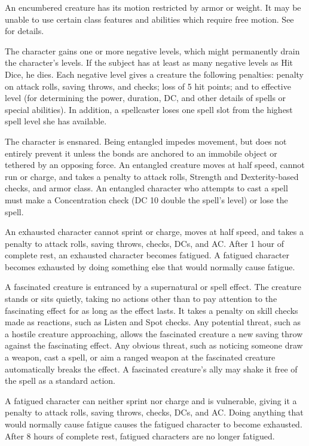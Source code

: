  An encumbered creature has its motion restricted by armor or weight. It may be unable to use certain class features and abilities which require free motion. See  for details.

 The character gains one or more negative levels, which might permanently drain the character's levels. If the subject has at least as many negative levels as Hit Dice, he dies. Each negative level gives a creature the following penalties:  penalty on attack rolls, saving throws, and checks; loss of 5 hit points; and  to effective level (for determining the power, duration, DC, and other details of spells or special abilities). In addition, a spellcaster loses one spell slot from the highest spell level she has available.

 The character is ensnared. Being entangled impedes movement, but does not entirely prevent it unless the bonds are anchored to an immobile object or tethered by an opposing force. An entangled creature moves at half speed, cannot run or charge, and takes a  penalty to attack rolls, Strength and Dexterity-based checks, and armor class. An entangled character who attempts to cast a spell must make a Concentration check (DC 10 \add double the spell's level) or lose the spell.

 An exhausted character cannot sprint or charge, moves at half speed, and takes a  penalty to attack rolls, saving throws, checks, DCs, and AC. After 1 hour of complete rest, an exhausted character becomes fatigued. A fatigued character becomes exhausted by doing something else that would normally cause fatigue.

 A fascinated creature is entranced by a supernatural or spell effect. The creature stands or sits quietly, taking no actions other than to pay attention to the fascinating effect for as long as the effect lasts. It takes a  penalty on skill checks made as reactions, such as Listen and Spot checks. Any potential threat, such as a hostile creature approaching, allows the fascinated creature a new saving throw against the fascinating effect. Any obvious threat, such as noticing someone draw a weapon, cast a spell, or aim a ranged weapon at the fascinated creature automatically breaks the effect. A fascinated creature's ally may shake it free of the spell as a standard action.

 A fatigued character can neither sprint nor charge and is vulnerable, giving it a  penalty to attack rolls, saving throws, checks, DCs, and AC. Doing anything that would normally cause fatigue causes the fatigued character to become exhausted. After 8 hours of complete rest, fatigued characters are no longer fatigued.

